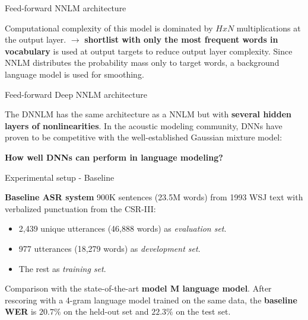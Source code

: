 \documentclass{beamer}
\begin{document}
\begin{frame}{Feed-forward NNLM architecture}


Computational complexity of this model is dominated by $HxN $ multiplications at the output layer.
\newline
\newline
$\rightarrow$ \textbf{shortlist with only the most frequent words in vocabulary} is used at output targets to reduce output layer complexity.
\newline
\newline
Since NNLM distributes the probability mass only to target words, a background language model is used for smoothing.


\end{frame}


\begin{frame}{Feed-forward Deep NNLM architecture}

The DNNLM has the same architecture as a NNLM but with \textbf{several hidden layers of nonlinearities}.
\newline
\newline
In the acoustic modeling community, DNNs have proven to be competitive with the well-established Gaussian mixture model:
\newline
\begin{center}
\textbf{How well DNNs can perform in language modeling?}
\end{center}

\end{frame}


\begin{frame}{Experimental setup - \small{Baseline}}

\textbf{Baseline ASR system}
\newline
\newline
900K sentences (23.5M words) from 1993 WSJ text with verbalized punctuation from the CSR-III: \\
\begin{itemize}
    \item 2,439 unique utterances (46,888 words) as \textit{evaluation set}.
    \item 977 utterances (18,279 words) as \textit{development set}.
    \item The rest as \textit{training set}.\\
\end{itemize}

Comparison with the state-of-the-art \textbf{model M language model}.
\newline
\newline
After rescoring with a 4-gram language model trained on the same data, the \textbf{baseline WER} is $20.7\%$ on the held-out set and $22.3\%$ on the test set.

\end{frame}
\end{document}
